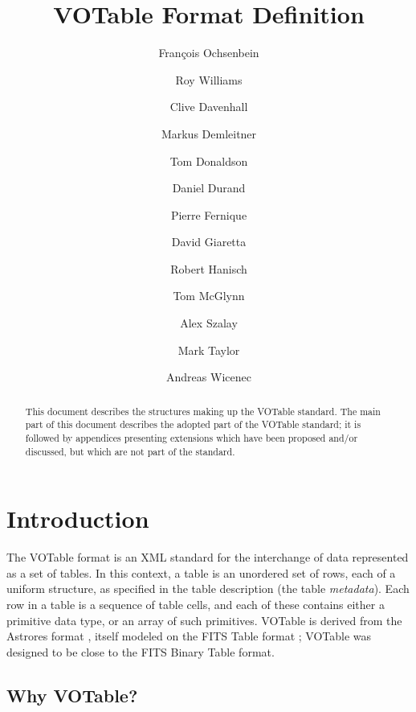 \documentclass[11pt,a4paper]{ivoa}
\title{VOTable Format Definition}
\author[http://www.ivoa.net/twiki/bin/view/IVOA/FrancoisOchsenbein]
                                               {Fran\c{c}ois Ochsenbein}
\author[http://www.ivoa.net/twiki/bin/view/IVOA/RoyWilliams]{Roy Williams}
\author[http://www.ivoa.net/twiki/bin/view/IVOA/CliveDavenhall]{Clive Davenhall}
\author[http://www.ivoa.net/twiki/bin/view/IVOA/MarkusDemleitner]
                                               {Markus Demleitner}
\author[http://www.ivoa.net/twiki/bin/view/IVOA/TomDonaldson]{Tom Donaldson}
\author[http://www.ivoa.net/twiki/bin/view/IVOA/DanielDurand]{Daniel Durand}
\author[http://www.ivoa.net/twiki/bin/view/IVOA/PierreFernique]{Pierre Fernique}
\author[http://www.ivoa.net/twiki/bin/view/IVOA/DavidGiaretta]{David Giaretta}
\author[http://www.ivoa.net/twiki/bin/view/IVOA/BobHanisch]{Robert Hanisch}
\author[http://www.ivoa.net/twiki/bin/view/IVOA/TomMcGlynn]{Tom McGlynn}
\author[http://www.ivoa.net/twiki/bin/view/IVOA/AlexSzalay]{Alex Szalay}
\author[http://www.ivoa.net/twiki/bin/view/IVOA/MarkTaylor]{Mark Taylor}
\author[http://www.ivoa.net/twiki/bin/view/IVOA/AndreasWicenec]{Andreas Wicenec}
\begin{document}
\begin{abstract}
This document describes the structures making up
the VOTable standard.
The main part of this document describes the adopted part of the
VOTable standard; it is followed by appendices presenting extensions
which have been proposed and/or discussed, but which are not part of
the standard.
\end{abstract}


%
%
%


\section{Introduction}

The VOTable format is an XML standard for the interchange of data
represented as a set of tables.
In this context, a table is an unordered set of rows, each of
a uniform structure, as specified in the table description
(the table {\em metadata}).
Each row in a table is a sequence of table cells, and each of these contains
either a primitive data type, or an array of such primitives.
VOTable is derived from the
Astrores format \citep{astrores}, itself modeled on the FITS Table format
\citep{std:FITS};
VOTable was designed to be close to the FITS Binary Table format.

\subsection{Why VOTable?}
\end{document}
